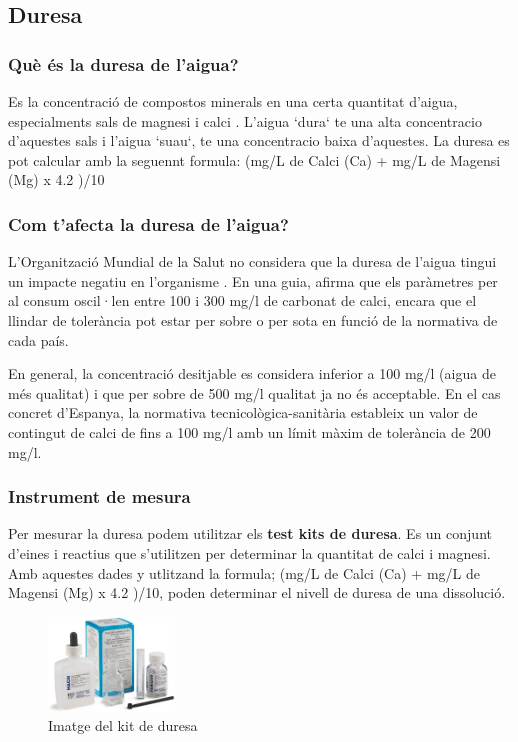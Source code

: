 \subsection{Duresa} \label{subsec:duresa}
\subsubsection{Què és la duresa de l'aigua?}
Es la concentració de compostos minerals en una certa quantitat d'aigua, especialments sals de magnesi i calci \cite{Facsa}. L'aigua `dura` te una alta concentracio d'aquestes sals i l'aigua `suau`, te una concentracio baixa d'aquestes. La duresa es pot calcular amb la seguennt formula: (mg/L de Calci (Ca) + mg/L de Magensi (Mg) x 4.2 )/10
\subsubsection{Com t’afecta la duresa de l’aigua?}
L'Organització Mundial de la Salut no considera que la duresa de l'aigua tingui un impacte negatiu en l'organisme . En una guia, afirma que els paràmetres per al consum oscil·len entre 100 i 300 mg/l de carbonat de calci, encara que el llindar de tolerància pot estar per sobre o per sota en funció de la normativa de cada país. \cite{Brita}

En general, la concentració desitjable es considera inferior a 100 mg/l (aigua de més qualitat) i que per sobre de 500 mg/l qualitat ja no és acceptable. En el cas concret d'Espanya, la normativa tecnicològica-sanitària estableix un valor de contingut de calci de fins a 100 mg/l amb un límit màxim de tolerància de 200 mg/l. \cite{Brita}
\subsubsection{Instrument de mesura}
Per mesurar la duresa podem utilitzar els \textbf{test kits de duresa}.
Es un conjunt d’eines i reactius que s’utilitzen per determinar la quantitat de calci i magnesi.
Amb aquestes dades y utlitzand la formula; (mg/L de Calci (Ca) + mg/L de Magensi (Mg) x 4.2 )/10, poden determinar el nivell de duresa de una dissolució.
\begin{figure}[H]
\centering
\includegraphics[width=0.3\textwidth]{./Figures/testduresa.png}
\caption{Imatge del kit de duresa}
\label{fig:kitsduresa}
\end{figure}

